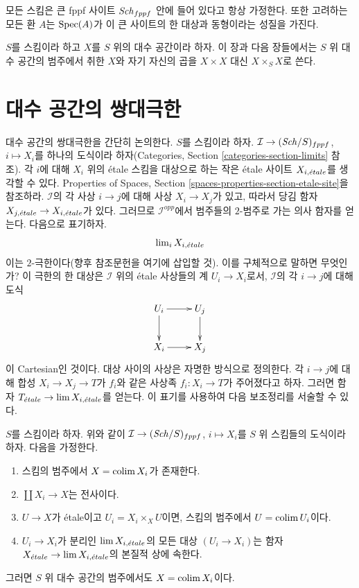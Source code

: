 \noindent
모든 스킴은 큰 fppf 사이트 $\mathit{Sch}_{fppf}$ 안에 들어 있다고 항상 가정한다.
또한 고려하는 모든 환 $A$는 $\mathop{\mathrm{Spec}}(A)$가 이 큰 사이트의
한 대상과 동형이라는 성질을 가진다.

\medskip\noindent
$S$를 스킴이라 하고 $X$를 $S$ 위의 대수 공간이라 하자.
이 장과 다음 장들에서는 $S$ 위 대수 공간의 범주에서 취한
$X$와 자기 자신의 곱을 $X \times X$ 대신 $X \times_S X$로 쓴다.




\section{대수 공간의 쌍대극한}
\label{section-pushouts-generalities}

\noindent
대수 공간의 쌍대극한을 간단히 논의한다. $S$를 스킴이라 하자.
$\mathcal{I} \to (\mathit{Sch}/S)_{fppf}$, $i \mapsto X_i$를 하나의
도식이라 하자(Categories, Section
\ref{categories-section-limits} 참조).
각 $i$에 대해 $X_i$ 위의 \'etale 스킴을 대상으로 하는 작은 \'etale 사이트
$X_{i, {\acute{e}tale}}$를 생각할 수 있다. Properties of Spaces, Section
\ref{spaces-properties-section-etale-site}을 참조하라.
$\mathcal{I}$의 각 사상 $i \to j$에 대해 사상 $X_i \to X_j$가 있고,
따라서 당김 함자
$X_{j, {\acute{e}tale}} \to X_{i, {\acute{e}tale}}$가 있다.
그러므로 $\mathcal{I}^{opp}$에서 범주들의 $2$-범주로 가는
의사 함자를 얻는다. 다음으로 표기하자.
$$
\mathop{\mathrm{lim}}\nolimits_i X_{i, {\acute{e}tale}}
$$
이는 $2$-극한이다(향후 참조문헌을 여기에 삽입할 것).
이를 구체적으로 말하면 무엇인가? 이 극한의 한 대상은
$\mathcal{I}$ 위의 \'etale 사상들의 계 $U_i \to X_i$로서,
$\mathcal{I}$의 각 $i \to j$에 대해 도식
$$
\xymatrix{
U_i \ar[r] \ar[d] & U_j \ar[d] \\
X_i \ar[r] & X_j
}
$$
이 Cartesian인 것이다. 대상 사이의 사상은 자명한 방식으로 정의한다.
각 $i \to j$에 대해 합성 $X_i \to X_j \to T$가 $f_i$와 같은
사상족 $f_i : X_i \to T$가 주어졌다고 하자.
그러면 함자 $T_{\acute{e}tale} \to \mathop{\mathrm{lim}}\nolimits X_{i, {\acute{e}tale}}$를 얻는다.
이 표기를 사용하여 다음 보조정리를 서술할 수 있다.

\begin{lemma}
\label{lemma-colimit-agrees}
$S$를 스킴이라 하자. 위와 같이
$\mathcal{I} \to (\mathit{Sch}/S)_{fppf}$, $i \mapsto X_i$를
$S$ 위 스킴들의 도식이라 하자. 다음을 가정한다.
\begin{enumerate}
\item 스킴의 범주에서 $X = \mathop{\mathrm{colim}}\nolimits X_i$가 존재한다.
\item $\coprod X_i \to X$는 전사이다.
\item $U \to X$가 \'etale이고 $U_i = X_i \times_X U$이면,
스킴의 범주에서 $U = \mathop{\mathrm{colim}}\nolimits U_i$이다.
\item $U_i \to X_i$가 분리인
$\mathop{\mathrm{lim}}\nolimits X_{i, {\acute{e}tale}}$의 모든 대상 $(U_i \to X_i)$는
함자 $X_{\acute{e}tale} \to \mathop{\mathrm{lim}}\nolimits X_{i, {\acute{e}tale}}$의 본질적 상에 속한다.
\end{enumerate}
그러면 $S$ 위 대수 공간의 범주에서도 $X = \mathop{\mathrm{colim}}\nolimits X_i$이다.
\end{lemma}

